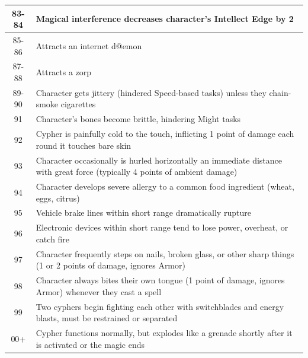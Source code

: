 \begin{longtable}{| c | p{15cm} |}
83-84 & Magical interference decreases character’s Intellect Edge by 2  \\ \hline
85-86 & Attracts an internet d@emon  \\ \hline
87-88 & Attracts a zorp  \\ \hline
89-90 & Character gets jittery (hindered Speed-based tasks) unless they chain-smoke cigarettes  \\ \hline
91 & Character’s bones become brittle, hindering Might tasks  \\ \hline
92 & Cypher is painfully cold to the touch, inflicting 1 point of damage each round it touches bare skin  \\ \hline
93 & Character occasionally is hurled horizontally an immediate distance with great force (typically 4 points of ambient damage)  \\ \hline
94 & Character develops severe allergy to a common food ingredient (wheat, eggs, citrus)  \\ \hline
95 & Vehicle brake lines within short range dramatically rupture  \\ \hline
96 & Electronic devices within short range tend to lose power, overheat, or catch fire  \\ \hline
97 & Character frequently steps on nails, broken glass, or other sharp things (1 or 2 points of damage, ignores Armor)  \\ \hline
98 & Character always bites their own tongue (1 point of damage, ignores Armor) whenever they cast a spell  \\ \hline
99 & Two cyphers begin fighting each other with switchblades and energy blasts, must be restrained or separated  \\ \hline
00+ & Cypher functions normally, but explodes like a grenade shortly after it is activated or the magic ends  \\ \hline

\end{longtable}

